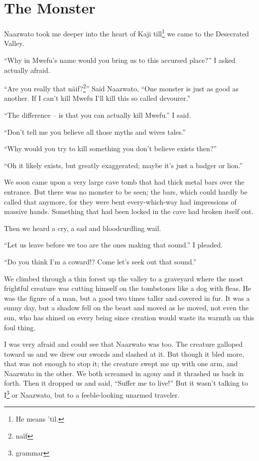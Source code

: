 \chapter{The Monster}
Naa\-zwa\-to took me deeper into the heart of Ka\-ji till\footnote{He means 'til.} we came to the Desecrated Valley.

``Why in Mwe\-fu's name would you bring us to this accursed place?'' I asked actually afraid.

``Are you really that n{\"a}if?\footnote{na{\"i}f}'' Said Naa\-zwa\-to, ``One monster is just as good as another. If I can't kill Mwe\-fu I'll kill this so called devourer.''

``The difference -- is that you can actually kill Mwe\-fu.'' I said.

``Don't tell me you believe all those myths and wives tales.''

``Why would you try to kill something you don't believe exists then?''

``Oh it likely exists, but greatly exaggerated; maybe it's just a badger or lion.''

We soon came upon a very large cave tomb that had thick metal bars over the entrance. But there was no monster to be seen; the bars, which could hardly be called that anymore, for they were bent every-which-way had impressions of massive hands. Something that had been locked in the cave had broken itself out.

Then we heard a cry, a sad and bloodcurdling wail.

``Let us leave before we too are the ones making that sound.'' I pleaded.

``Do you think I'm a coward!? Come let's seek out that sound.''

We climbed through a thin forest up the valley to a graveyard where the most frightful creature was cutting himself on the tombstones like a dog with fleas.
He was the figure of a man, but a good two times taller and covered in fur.
It was a sunny day, but a shadow fell on the beast and moved as he moved, not even the sun, who has shined on every being since creation would waste its warmth on this foul thing.

I was very afraid and could see that Naa\-zwa\-to was too. The creature galloped toward us and we drew our swords and slashed at it. But though it bled more, that was not enough to stop it; the creature swept me up with one arm, and Naa\-zwa\-to in the other. We both screamed in agony and it thrashed us back in forth.
Then it dropped us and said, ``Suffer me to live!'' But it wasn't talking to I\footnote{grammar} or Naa\-zwa\-to, but to a feeble-looking unarmed traveler.


